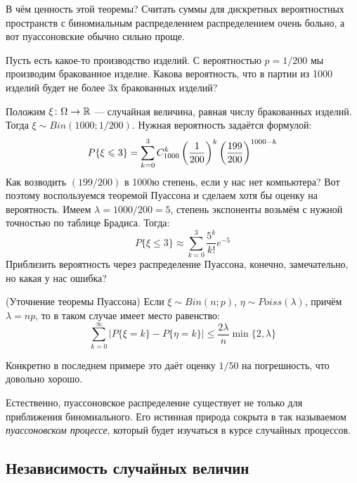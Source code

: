 \begin{note}
	В чём ценность этой теоремы? Считать суммы для дискретных вероятностных пространств с биномиальным распределением распределением очень больно, а вот пуассоновские обычно сильно проще.
\end{note}

\begin{example}
	Пусть есть какое-то производство изделий. С вероятностью $p = 1/200$ мы производим бракованное изделие. Какова вероятность, что в партии из 1000 изделий будет не более 3х бракованных изделий?
	
	Положим $\xi \colon \Omega \to \mathbb{R}$ --- случайная величина, равная числу бракованных изделий. Тогда $\xi \sim Bin(1000; 1/200)$. Нужная вероятность задаётся формулой:
	\[
		P\{\xi \leqslant 3\} = \sum_{k = 0}^3 C_{1000}^k \left(\frac{1}{200}\right)^k \left(\frac{199}{200}\right)^{1000 - k}
	\]
	Как возводить $(199 / 200)$ в 1000ю степень, если у нас нет компьютера? Вот поэтому воспользуемся теоремой Пуассона и сделаем хотя бы оценку на вероятность. Имеем $\lambda = 1000 / 200 = 5$, степень экспоненты возьмём с нужной точностью по таблице Брадиса. Тогда:
	\[
		P\{\xi \le 3\} \approx \sum_{k = 0}^3 \frac{5^k}{k!} e^{-5}
	\]
	Приблизить вероятность через распределение Пуассона, конечно, замечательно, но какая у нас ошибка?
\end{example}

\begin{proposition} (Уточнение теоремы Пуассона)
	Если $\xi \sim Bin(n; p)$, $\eta \sim Poiss(\lambda)$, причём $\lambda = np$, то в таком случае имеет место равенство:
	\[
		\sum_{k = 0}^\infty |P\{\xi = k\} - P\{\eta = k\}| \le \frac{2\lambda}{n} \min\{2, \lambda\}
	\]
\end{proposition}

\begin{note}
	Конкретно в последнем примере это даёт оценку $1 / 50$ на погрешность, что довольно хорошо.
\end{note}

\begin{note}
	Естественно, пуассоновское распределение существует не только для приближения биномиального. Его истинная природа сокрыта в так называемом \textit{пуассоновском процессе}, который будет изучаться в курсе случайных процессов.
\end{note}

\subsection{Независимость случайных величин}

